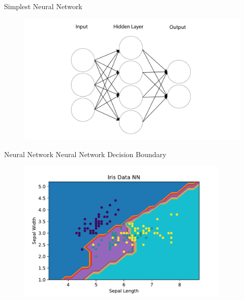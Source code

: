 \documentclass[10pt]{beamer}
\begin{document}
\begin{frame}{Simplest Neural Network}
		\begin{figure}	
			\includegraphics[width=1.0\textwidth, center, trim=0cm 0cm 0 0cm]{images/Dense_NN.pdf}
	\end{figure}
\end{frame}

\begin{frame}{Neural Network}
Neural Network Decision Boundary
		\begin{figure}
			\includegraphics[width=0.9\textwidth, center, trim=0cm 0cm 0 0cm]{images/Iris_Data_NN.pdf}
	\end{figure}
\end{frame}
\end{document}
